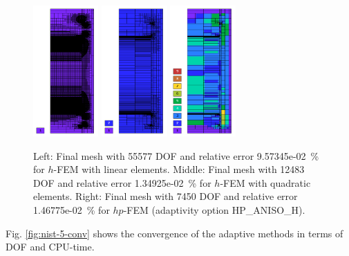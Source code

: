 \documentclass[12pt]{elsarticle}
\begin{document}
\begin{figure}[H]
\centering
\includegraphics[height=5cm]{nist/nist-5/mesh_h1_aniso.png}
\includegraphics[height=5cm]{nist/nist-5/mesh_h2_aniso.png}
\includegraphics[height=5cm]{nist/nist-5/mesh_hp_aniso.png}
\caption{
Left: Final mesh with 55577 DOF and relative error 9.57345e-02~\% for $h$-FEM with linear elements.
Middle: Final mesh with 12483 DOF and relative error 1.34925e-02~\% for $h$-FEM with quadratic elements. 
Right: Final mesh with 7450 DOF and relative error 1.46775e-02~\% for $hp$-FEM (adaptivity option HP\_ANISO\_H).}
\label{fig:nist-5-hp-aniso}
\end{figure}

Fig. \ref{fig:nist-5-conv} shows the convergence of the adaptive methods in terms of DOF and CPU-time.
\end{document}
